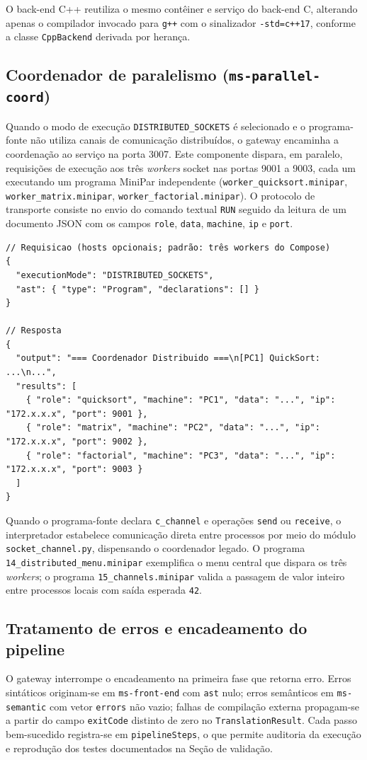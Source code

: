 O back-end C++ reutiliza o mesmo contêiner e serviço do back-end C, alterando apenas o compilador invocado para \texttt{g++} com o sinalizador \texttt{-std=c++17}, conforme a classe \texttt{CppBackend} derivada por herança.

\subsection{Coordenador de paralelismo (\texttt{ms-parallel-coord})}

Quando o modo de execução \texttt{DISTRIBUTED\_SOCKETS} é selecionado e o programa-fonte não utiliza canais de comunicação distribuídos, o gateway encaminha a coordenação ao serviço na porta 3007. Este componente dispara, em paralelo, requisições de execução aos três \emph{workers} socket nas portas 9001 a 9003, cada um executando um programa MiniPar independente (\texttt{worker\_quicksort.minipar}, \texttt{worker\_matrix.minipar}, \texttt{worker\_factorial.minipar}). O protocolo de transporte consiste no envio do comando textual \texttt{RUN} seguido da leitura de um documento JSON com os campos \texttt{role}, \texttt{data}, \texttt{machine}, \texttt{ip} e \texttt{port}.

\begin{lstlisting}[caption={Requisição e resposta de \texttt{POST /coordinate}}]
// Requisicao (hosts opcionais; padrão: três workers do Compose)
{
  "executionMode": "DISTRIBUTED_SOCKETS",
  "ast": { "type": "Program", "declarations": [] }
}

// Resposta
{
  "output": "=== Coordenador Distribuido ===\n[PC1] QuickSort: ...\n...",
  "results": [
    { "role": "quicksort", "machine": "PC1", "data": "...", "ip": "172.x.x.x", "port": 9001 },
    { "role": "matrix", "machine": "PC2", "data": "...", "ip": "172.x.x.x", "port": 9002 },
    { "role": "factorial", "machine": "PC3", "data": "...", "ip": "172.x.x.x", "port": 9003 }
  ]
}
\end{lstlisting}

Quando o programa-fonte declara \texttt{c\_channel} e operações \texttt{send} ou \texttt{receive}, o interpretador estabelece comunicação direta entre processos por meio do módulo \texttt{socket\_channel.py}, dispensando o coordenador legado. O programa \texttt{14\_distributed\_menu.minipar} exemplifica o menu central que dispara os três \emph{workers}; o programa \texttt{15\_channels.minipar} valida a passagem de valor inteiro entre processos locais com saída esperada \texttt{42}.

\subsection{Tratamento de erros e encadeamento do pipeline}

O gateway interrompe o encadeamento na primeira fase que retorna erro. Erros sintáticos originam-se em \texttt{ms-front-end} com \texttt{ast} nulo; erros semânticos em \texttt{ms-semantic} com vetor \texttt{errors} não vazio; falhas de compilação externa propagam-se a partir do campo \texttt{exitCode} distinto de zero no \texttt{TranslationResult}. Cada passo bem-sucedido registra-se em \texttt{pipelineSteps}, o que permite auditoria da execução e reprodução dos testes documentados na Seção de validação.
